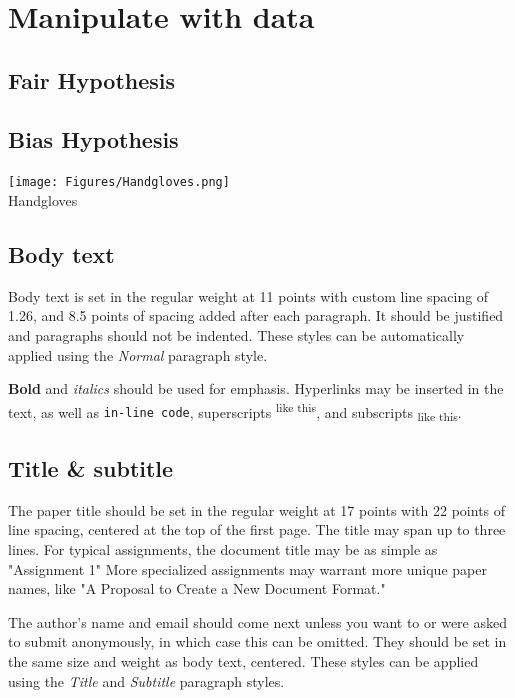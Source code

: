 \documentclass[
	letterpaper, %
]{jdf}
\begin{document}
\section{Manipulate with data}
\subsection{Fair Hypothesis}
\subsection{Bias Hypothesis}


\begin{jdffigure}
\texttt{[image: Figures/Handgloves.png]} \\
{\huge Handgloves}%
\label{fig:Palatino}%
\end{jdffigure}

\subsection{Body text}
Body text is set in the regular weight at 11 points with custom line spacing of 1.26, and 8.5 points of spacing added after each paragraph. It should be justified and paragraphs should not be indented. These styles can be automatically applied using the \emph{Normal} paragraph style.

\textbf{Bold} and \textit{italics} should be used for emphasis. Hyperlinks may be inserted in the text, as well as {\tt in-line code}, superscripts\textsuperscript{ like this}, and subscripts\textsubscript{ like this}.

\subsection{Title \& subtitle}
The paper title should be set in the regular weight at 17 points with 22 points of line spacing, centered at the top of the first page. The title may span up to three lines. For typical assignments, the document title may be as simple as "Assignment 1" More specialized assignments may warrant more unique paper names, like "A Proposal to Create a New Document Format."

The author’s name and email should come next unless you want to or were asked to submit anonymously, in which case this can be omitted. They should be set in the same size and weight as body text, centered. These styles can be applied using the \emph{Title} and \emph{Subtitle} paragraph styles.
\end{document}
